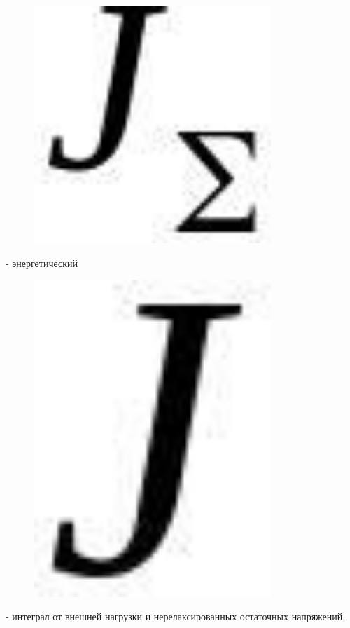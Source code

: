 \begin{figure}[H]
	\centering
	\includegraphics[width=0.8\textwidth]{assets/1224}
	\caption*{}
\end{figure}- энергетический
\begin{figure}[H]
	\centering
	\includegraphics[width=0.8\textwidth]{assets/1225}
	\caption*{}
\end{figure} - интеграл от внешней нагрузки и
нерелаксированных остаточных напряжений.

